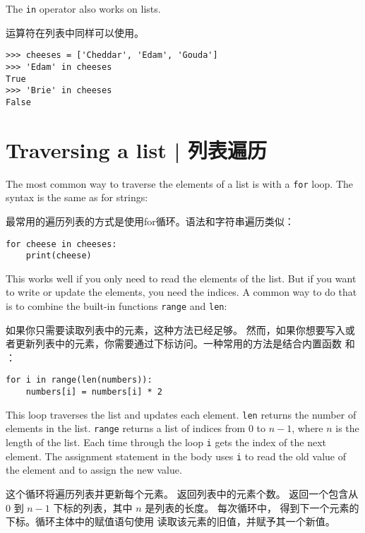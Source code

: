 The {\tt in} operator also works on lists.

 运算符在列表中同样可以使用。

\begin{lstlisting}
>>> cheeses = ['Cheddar', 'Edam', 'Gouda']
>>> 'Edam' in cheeses
True
>>> 'Brie' in cheeses
False
\end{lstlisting}


\section{Traversing a list  |  列表遍历}
  
  

The most common way to traverse the elements of a list is
with a {\tt for} loop.  The syntax is the same as for strings:

最常用的遍历列表的方式是使用for循环。语法和字符串遍历类似：

\begin{lstlisting}
for cheese in cheeses:
    print(cheese)
\end{lstlisting}

%
This works well if you only need to read the elements of the
list.  But if you want to write or update the elements, you
need the indices.  A common way to do that is to combine
the built-in functions {\tt range} and {\tt len}:

如果你只需要读取列表中的元素，这种方法已经足够。 然而，如果你想要写入或者更新列表中的元素，你需要通过下标访问。一种常用的方法是结合内置函数  和  ：
  



\begin{lstlisting}
for i in range(len(numbers)):
    numbers[i] = numbers[i] * 2
\end{lstlisting}

%
This loop traverses the list and updates each element.  {\tt len}
returns the number of elements in the list.  {\tt range} returns
a list of indices from 0 to $n-1$, where $n$ is the length of
the list.  Each time through the loop {\tt i} gets the index
of the next element.  The assignment statement in the body uses
{\tt i} to read the old value of the element and to assign the
new value.

这个循环将遍历列表并更新每个元素。  返回列表中的元素个数。  返回一个包含从 0 到 $n-1$ 下标的列表，其中 $n$ 是列表的长度。
每次循环中， 得到下一个元素的下标。循环主体中的赋值语句使用  读取该元素的旧值，并赋予其一个新值。
  

